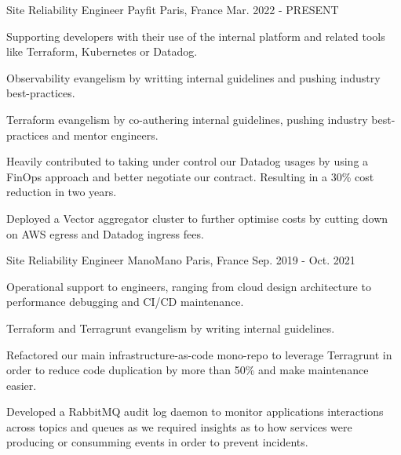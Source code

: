 

\begin{cventries}

  \cventry
    {Site Reliability Engineer} %
    {Payfit} %
    {Paris, France} %
    {Mar. 2022 - PRESENT} %
    {
      \begin{cvitems} %
        \item {Supporting developers with their use of the internal platform and related tools like Terraform, Kubernetes or Datadog.}
        \item {Observability evangelism by writting internal guidelines and pushing industry best-practices.}
        \item {Terraform evangelism by co-authering internal guidelines, pushing industry best-practices and mentor engineers.}
        \item {Heavily contributed to taking under control our Datadog usages by using a FinOps approach and better negotiate our contract. Resulting in a 30\% cost reduction in two years.}
        \item {Deployed a Vector aggregator cluster to further optimise costs by cutting down on AWS egress and Datadog ingress fees.}
      \end{cvitems}
    }

  \cventry
    {Site Reliability Engineer} %
    {ManoMano} %
    {Paris, France} %
    {Sep. 2019 - Oct. 2021} %
    {
      \begin{cvitems} %
        \item {Operational support to engineers, ranging from cloud design architecture to performance debugging and CI/CD maintenance.}
        \item {Terraform and Terragrunt evangelism by writing internal guidelines.}
        \item {Refactored our main infrastructure-as-code mono-repo to leverage Terragrunt in order to reduce code duplication by more than 50\% and make maintenance easier.}
        \item {Developed a RabbitMQ audit log daemon to monitor applications interactions across topics and queues as we required insights as to how services were producing or consumming events in order to prevent incidents.}
      \end{cvitems}
    }


\end{cventries}
